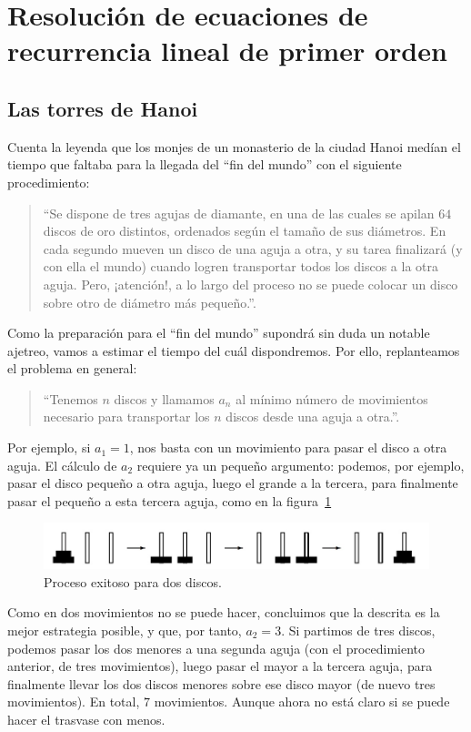 \section{Resolución de ecuaciones de recurrencia lineal de primer orden}

\subsection{Las torres de Hanoi}

Cuenta la leyenda que los monjes de un monasterio de la ciudad Hanoi medían el tiempo que faltaba para la llegada del ``fin del mundo'' con el siguiente procedimiento:
\begin{quote}
	``Se dispone de tres agujas de diamante, en una de las cuales se apilan $64$ discos de oro distintos, ordenados según el tamaño de sus diámetros. En cada segundo mueven un disco de una aguja a otra, y su tarea finalizará (y con ella el mundo) cuando logren transportar todos los discos a la otra aguja. Pero, ¡atención!, a lo largo del proceso no se puede colocar un disco sobre otro de diámetro más pequeño.''.
\end{quote}
Como la preparación para el ``fin del mundo'' supondrá sin duda un notable ajetreo, vamos a estimar el tiempo del cuál dispondremos. Por ello, replanteamos el problema en general:
\begin{quote}
	``Tenemos $n$ discos y llamamos $a_n$ al mínimo número de movimientos necesario para transportar los $n$ discos desde una aguja a otra.''.
\end{quote}
Por ejemplo, si $a_{1}=1$, nos basta con un movimiento para pasar el disco a otra aguja. El cálculo de $a_2$ requiere ya un pequeño argumento: podemos, por ejemplo, pasar el disco pequeño a otra aguja, luego el grande a la tercera, para finalmente pasar el pequeño a esta tercera aguja, como en la figura~\ref{fig:hanoi}
\begin{figure}[ht!]
	\sidecaption[t]%
	\centering
	\includegraphics[width=0.4\paperwidth]{./img/hanoi.jpg}
	\caption{\label{fig:hanoi} Proceso exitoso para dos discos.}
\end{figure}
Como en dos movimientos no se puede hacer, concluimos que la descrita es la mejor estrategia posible, y que, por tanto, $a_{2}= 3$. Si partimos de tres discos, podemos pasar los dos menores a una segunda aguja (con el procedimiento anterior, de tres movimientos), luego pasar el mayor a la tercera aguja, para finalmente llevar los dos discos menores sobre ese disco mayor (de nuevo tres movimientos). En total, $7$ movimientos. Aunque ahora no está claro si se puede hacer el trasvase con menos.

